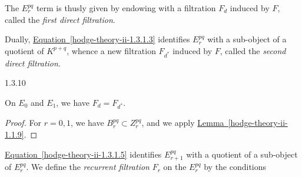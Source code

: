    The \(E_r^{pq}\) term is thusly given by endowing with a filtration \(F_d\) induced by \(F\), called the \emph{first direct filtration}.\label{hodge-theory-ii-1.3.9}\par{}Dually, \hyperref[hodge-theory-ii-1.3.1.3]{Equation~\ref*{hodge-theory-ii-1.3.1.3}} identifies \(E_r^{pq}\) with a sub-object of a quotient of \(K^{p+q}\), whence a new filtration \(F_{d^*}\) induced by \(F\), called the \emph{second direct filtration}.\begin{lemma}{1.3.10}\label{hodge-theory-ii-1.3.10}\skipsinglepar\par{}On \(E_0\) and \(E_1\), we have \(F_d=F_{d^*}\).\begin{proof}\par{}For \(r=0,1\), we have \(B_r^{pq}\subset  Z_r^{pq}\), and we apply \hyperref[hodge-theory-ii-1.1.9]{Lemma~\ref*{hodge-theory-ii-1.1.9}}.\end{proof}\end{lemma}\label{hodge-theory-ii-1.3.11}\par{}\hyperref[hodge-theory-ii-1.3.1.5]{Equation~\ref*{hodge-theory-ii-1.3.1.5}} identifies \(E_{r+1}^{pq}\) with a quotient of a sub-object of \(E_r^{pq}\).
    We define the \emph{recurrent filtration} \(F_r\) on the \(E_r^{pq}\) by the conditions

